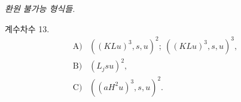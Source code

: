 
\noindent\emph{환원 불가능 형식들.}

\noindent 계수차수 13.
\[
\begin{array}{rl}
\text{A)}&((KLu)^3,s,u)^2;\ ((KLu)^3,s,u)^3,\\[0.25em]
\text{B)}&(L_jsu)^2,\\[0.25em]
\text{C)}&((aH^2u)^3,s,u)^2.
\end{array}
\]
